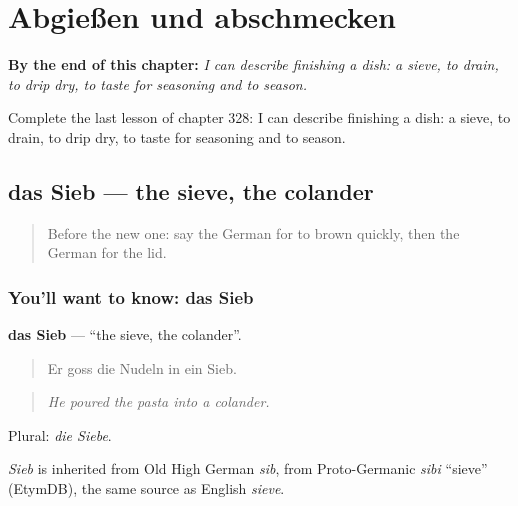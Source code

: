 
\chapter{Abgießen und abschmecken}
\label{ch:ge-abgie-en-und-abschmecken}

\begin{chapteropening}
\textbf{By the end of this chapter:} \emph{I can describe finishing a dish: a sieve, to drain, to drip dry, to taste for seasoning and to season.}

Complete the last lesson of chapter 328: I can describe finishing a dish: a sieve, to drain, to drip dry, to taste for seasoning and to season.
\end{chapteropening}

\section[das Sieb]{das Sieb — the sieve, the colander}

\label{lesson:GE-C328-sieb}



\begin{quote}
Before the new one: say the German for to brown quickly, then the German for the lid.
\end{quote}

\subsection*{You'll want to know: das Sieb}
\textbf{das Sieb} — \textquotedblleft{}the sieve, the colander\textquotedblright{}.

\begin{quote}
Er goss die Nudeln in ein Sieb.
\end{quote}

\begin{quote}
\emph{He poured the pasta into a colander.}
\end{quote}

Plural: \emph{die Siebe}.

\begin{cousinweb}
\emph{Sieb} is inherited from Old High German \emph{sib}, from Proto-Germanic \emph{sibi} \textquotedblleft{}sieve\textquotedblright{} (EtymDB), the same source as English \emph{sieve}.
\end{cousinweb}

